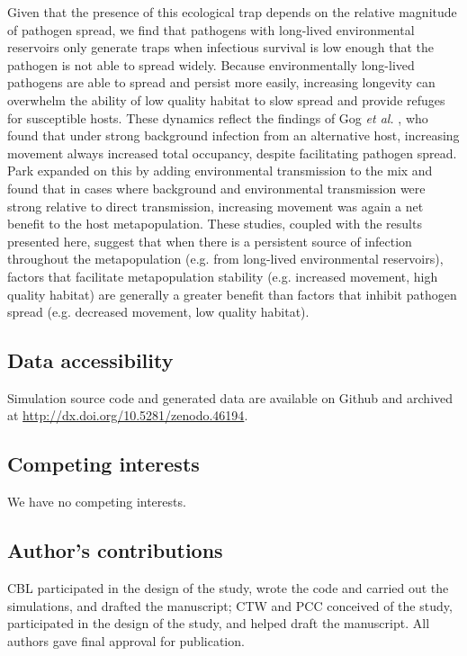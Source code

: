 \documentclass{article}
\begin{document}
Given that the presence of this ecological trap depends on the relative magnitude of pathogen spread, we find that pathogens with long-lived environmental reservoirs only generate traps when infectious survival is low enough that the pathogen is not able to spread widely.
Because environmentally long-lived pathogens are able to spread and persist more easily, increasing longevity can overwhelm the ability of low quality habitat to slow spread and provide refuges for susceptible hosts.
These dynamics reflect the findings of Gog \emph{et al.} \cite{Gog2002}, who found that under strong background infection from an alternative host, increasing movement always increased total occupancy, despite facilitating pathogen spread.  
Park \cite{Park2012} expanded on this by adding environmental transmission to the mix and found that in cases where background and environmental transmission were strong relative to direct transmission, increasing movement was again a net benefit to the host metapopulation.  
These studies, coupled with the results presented here, suggest that when there is a persistent source of infection throughout the metapopulation (e.g. from long-lived environmental reservoirs), factors that facilitate metapopulation stability (e.g. increased movement, high quality habitat) are generally a greater benefit than factors that inhibit pathogen spread (e.g. decreased movement, low quality habitat). 


\subsection*{Data accessibility}
Simulation source code and generated data are available on Github and archived at \url{http://dx.doi.org/10.5281/zenodo.46194}.

\subsection*{Competing interests}
We have no competing interests.

\subsection*{Author's contributions}
CBL participated in the design of the study, wrote the code and carried out the simulations, and drafted the manuscript; CTW and PCC conceived of the study, participated in the design of the study, and helped draft the manuscript.  All authors gave final approval for publication.
\end{document}
